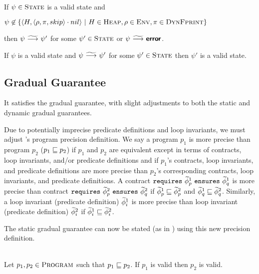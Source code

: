 \documentclass {llncs}
\begin{document}
\begin{proposition}\label{prop:gvlrp-progress-equi}
    If $\psi \in \textup{\textsc{State}}$ is a valid state and 
    
\noindent $\psi \not \in \{\langle H, \langle \rho, \pi, skip \rangle \cdot nil \rangle ~\vert~ H \in \textup{\textsc{Heap}}, \rho \in \textup{\textsc{Env}}, \pi \in \textup{\textsc{DynFprint}}\}$ 

\noindent then $\psi ~\widetilde{\longrightarrow}~ \psi'$ for some $\psi' \in \textup{\textsc{State}}$ or $\psi ~\widetilde{\longrightarrow}~ \textup{\textmd{\textsf{\textbf{error}}}}$. 
\end{proposition}

\begin{proposition}\label{prop:gvlrp-preservation-equi}
    If $\psi$ is a valid state and $\psi ~\widetilde{\longrightarrow}~ \psi'$ for some $\psi' \in \textup{\textsc{State}}$ then $\psi'$ is a valid state.
\end{proposition}

\subsection{Gradual Guarantee}
It satisfies the gradual guarantee, with slight adjustments to both the static and dynamic gradual guarantees.

Due to potentially imprecise predicate definitions and loop invariants, we must adjust \gvl's program precision definition. We say a program $p_1$ is more precise than program $p_2$ ($p_1 \sqsubseteq p_2$) if $p_1$ and $p_2$ are equivalent except in terms of contracts, loop invariants, and/or predicate definitions and if $p_1$'s contracts, loop invariants, and predicate definitions are more precise than $p_2$'s corresponding contracts, loop invariants, and predicate definitions.
A contract $\textup{\texttt{requires}}~{\widetilde{\phi}_p^1}~\textup{\texttt{ensures}}~{\widetilde{\phi}_q^1}$ is more precise than contract $\textup{\texttt{requires}}~{\widetilde{\phi}_p^2}~\textup{\texttt{ensures}}~{\widetilde{\phi}_q^2}$ if $\widetilde{\phi}_p^1 \sqsubseteq \widetilde{\phi}_p^2$ and $\widetilde{\phi}_q^1 \sqsubseteq \widetilde{\phi}_q^2$. Similarly, a loop invariant (predicate definition) $\widetilde{\phi}_i^1$ is more precise than loop invariant (predicate definition) $\widetilde{\phi}_i^2$ if $\widetilde{\phi}_i^1 \sqsubseteq \widetilde{\phi}_i^2$. 

The static gradual guarantee can now be stated (as in \gvl) using this new precision definition.

\begin{proposition}\label{prop:gvlidf-static-gg}~\\
    Let $p_1, p_2 \in \textup{\textsc{Program}}$ such that $p_1 \sqsubseteq p_2$.
    If $p_1$ is valid then $p_2$ is valid.
\end{proposition}
\end{document}
